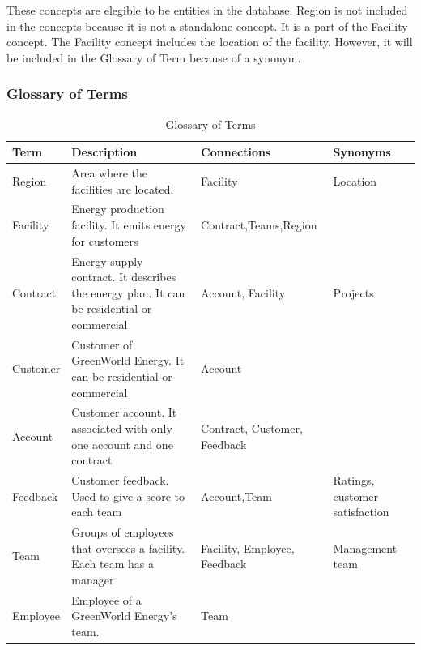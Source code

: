 These concepts are elegible to be entities in the database. Region is not included in the concepts because it is not a standalone concept. It is a part of the Facility concept. The Facility concept includes the location of the facility. However, it will be included in the Glossary of Term because of a synonym.
    \subsubsection{Glossary of Terms}
    \begin{table}[H]
        \renewcommand{\arraystretch}{1.3} %
        \begin{tabularx}{\textwidth}{|X|X|X|X|}
        \hline
        \textbf{Term}& \textbf{Description}  & \textbf{Connections}    & \textbf{Synonyms}     \\ \hline
        Region      & Area where the facilities are located. & Facility     & Location \\ \hline
        Facility     & Energy production facility. It emits energy for customers      & Contract,Teams,Region         &\\ \hline
        Contract     & Energy supply contract. It describes the energy plan. It can be residential or commercial & Account, Facility     &  Projects        \\ \hline
        Customer     & Customer of GreenWorld Energy. It can be residential or commercial       & Account    &        \\ \hline
        Account      & Customer account. It associated with only one account and one contract & Contract, Customer, Feedback     &        \\ \hline
        Feedback     & Customer feedback. Used to give a score to each team       & Account,Team     &         Ratings, customer satisfaction \\\hline
        Team        & Groups of employees that oversees a facility. Each team has a manager       & Facility, Employee, Feedback     &  Management team       \\ \hline
        Employee     & Employee of a GreenWorld Energy's team.      & Team     &        \\ \hline
        \end{tabularx}
        \caption{Glossary of Terms}
        \end{table}
  
